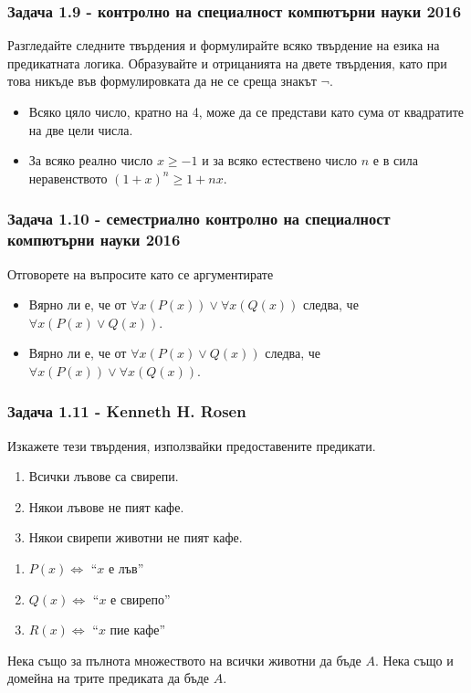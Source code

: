 \documentclass[12pt]{article}
\begin{document}
\subsubsection*{Задача 1.9 - контролно на специалност компютърни науки 2016}
Разгледайте следните твърдения и формулирайте всяко твърдение на езика на предикатната логика. Образувайте и отрицанията на двете твърдения, като при това никъде във формулировката да не се среща знакът $\neg$.
\begin{itemize}
    \item Всяко цяло число, кратно на 4, може да се представи като сума от квадратите на две цели числа.
    \item За всяко реално число $x \geq -1$ и за всяко естествено число $n$ е в сила неравенството $(1+x)^n \geq 1 + nx$.  
\end{itemize}

\subsubsection*{Задача 1.10 - семестриално контролно на специалност компютърни науки 2016}
Отговорете на въпросите като се аргументирате
\begin{itemize}
    \item Вярно ли е, че от $\forall x (P(x)) \lor \forall x(Q(x))$ следва, че $\forall x (P(x) \lor Q(x))$.
    \item Вярно ли е, че от $\forall x (P(x) \lor Q(x))$ следва, че $\forall x (P(x)) \lor \forall x(Q(x))$.
\end{itemize}

\subsubsection*{Задача 1.11 - Kenneth H. Rosen}
Изкажете тези твърдения, използвайки предоставените предикати.
\begin{enumerate}
    \item Всички лъвове са свирепи.
    \item Някои лъвове не пият кафе.
    \item Някои свирепи животни не пият кафе.
\end{enumerate}
\begin{enumerate}
    \item $P(x) \iff$ ``$x$ е лъв''
    \item $Q(x) \iff$ ``$x$ е свирепо''
    \item $R(x) \iff$ ``$x$ пие кафе''
\end{enumerate} 
Нека също за пълнота множеството на всички животни да бъде $A$. Нека също и домейна на трите предиката да бъде $A$.
\end{document}
